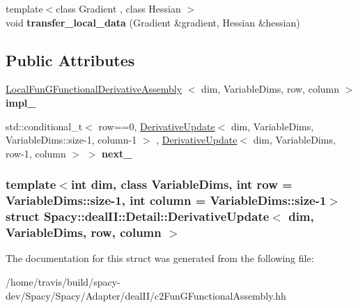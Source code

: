 \begin{DoxyCompactItemize}
\item 
\hypertarget{structSpacy_1_1dealII_1_1Detail_1_1DerivativeUpdate_a7a17089d65b40b4a6bf9ad45b39c6c60}{{\footnotesize template$<$class Gradient , class Hessian $>$ }\\void {\bfseries transfer\-\_\-local\-\_\-data} (\-Gradient \&gradient, \-Hessian \&hessian)}\label{structSpacy_1_1dealII_1_1Detail_1_1DerivativeUpdate_a7a17089d65b40b4a6bf9ad45b39c6c60}

\end{DoxyCompactItemize}
\subsection*{\-Public \-Attributes}
\begin{DoxyCompactItemize}
\item 
\hypertarget{structSpacy_1_1dealII_1_1Detail_1_1DerivativeUpdate_aaeba76d34842d0e91fd2e81c0f86963d}{\hyperlink{structSpacy_1_1dealII_1_1Detail_1_1LocalFunGFunctionalDerivativeAssembly}{\-Local\-Fun\-G\-Functional\-Derivative\-Assembly}\*
$<$ dim, \-Variable\-Dims, row, \*
column $>$ {\bfseries impl\-\_\-}}\label{structSpacy_1_1dealII_1_1Detail_1_1DerivativeUpdate_aaeba76d34842d0e91fd2e81c0f86963d}

\item 
\hypertarget{structSpacy_1_1dealII_1_1Detail_1_1DerivativeUpdate_a473ef25e1ff91ecccf92f4385c0f1dc5}{std\-::conditional\-\_\-t$<$ row==0, \*
\hyperlink{structSpacy_1_1dealII_1_1Detail_1_1DerivativeUpdate}{\-Derivative\-Update}$<$ dim, \*
\-Variable\-Dims, \*
\-Variable\-Dims\-::size-\/1, column-\/1 $>$\*
, \hyperlink{structSpacy_1_1dealII_1_1Detail_1_1DerivativeUpdate}{\-Derivative\-Update}$<$ dim, \*
\-Variable\-Dims, row-\/1, column $>$ $>$ {\bfseries next\-\_\-}}\label{structSpacy_1_1dealII_1_1Detail_1_1DerivativeUpdate_a473ef25e1ff91ecccf92f4385c0f1dc5}

\end{DoxyCompactItemize}
\subsubsection*{template$<$int dim, class Variable\-Dims, int row = \-Variable\-Dims\-::size-\/1, int column = \-Variable\-Dims\-::size-\/1$>$ struct Spacy\-::deal\-I\-I\-::\-Detail\-::\-Derivative\-Update$<$ dim, Variable\-Dims, row, column $>$}



\-The documentation for this struct was generated from the following file\-:\begin{DoxyCompactItemize}
\item 
/home/travis/build/spacy-\/dev/\-Spacy/\-Spacy/\-Adapter/deal\-I\-I/c2\-Fun\-G\-Functional\-Assembly.\-hh\end{DoxyCompactItemize}
